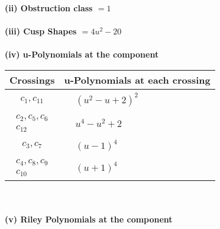 \documentclass[1p]{elsarticle_modified}
\theoremstyle{definition}
\begin{document}
\flushleft \textbf{(ii) Obstruction class $= 1$}\\~\\
\flushleft \textbf{(iii) Cusp Shapes $= 4 u^2-20$}\\~\\
\newpage\renewcommand{\arraystretch}{1}
\flushleft \textbf{(iv) u-Polynomials at the component}\newline \\
\begin{tabular}{m{50pt}|m{274pt}}
Crossings & \hspace{64pt}u-Polynomials at each crossing \\
\hline $$\begin{aligned}c_{1},c_{11}\end{aligned}$$&$\begin{aligned}
&(u^2- u+2)^2
\end{aligned}$\\
\hline $$\begin{aligned}c_{2},c_{5},c_{6}\\c_{12}\end{aligned}$$&$\begin{aligned}
&u^4- u^2+2
\end{aligned}$\\
\hline $$\begin{aligned}c_{3},c_{7}\end{aligned}$$&$\begin{aligned}
&(u-1)^4
\end{aligned}$\\
\hline $$\begin{aligned}c_{4},c_{8},c_{9}\\c_{10}\end{aligned}$$&$\begin{aligned}
&(u+1)^4
\end{aligned}$\\
\hline
\end{tabular}\\~\\
\newpage\renewcommand{\arraystretch}{1}
\flushleft \textbf{(v) Riley Polynomials at the component}\newline \\
\end{document}
